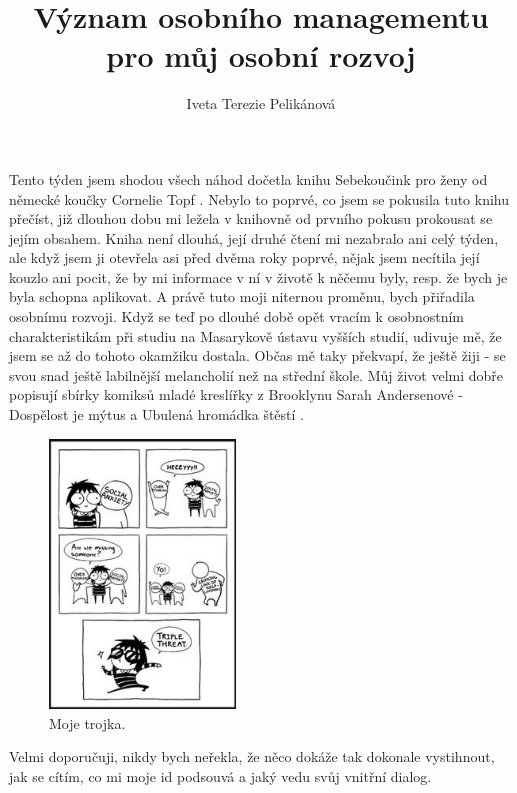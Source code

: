 \documentclass[a4paper]{scrartcl}
\title{Význam osobního managementu pro můj osobní rozvoj}
\subtitle{}
\author{Iveta Terezie Pelikánová}
\date{}
\begin{document}
\maketitle 

\noindent
Tento týden jsem shodou všech náhod dočetla knihu Sebekoučink pro ženy od německé koučky Cornelie Topf \cite{topf2014}. Nebylo to poprvé, co jsem se pokusila 
tuto knihu přečíst, již dlouhou dobu mi ležela v knihovně od prvního pokusu prokousat se jejím obsahem. Kniha není dlouhá, její druhé čtení mi nezabralo ani celý 
týden, ale když jsem ji otevřela asi před dvěma roky poprvé, nějak jsem necítila její kouzlo ani pocit, že by mi informace v ní v životě k něčemu byly, resp. že 
bych je byla schopna aplikovat. A právě tuto moji niternou proměnu, bych přiřadila osobnímu rozvoji. Když se teď po dlouhé době opět vracím k osobnostním 
charakteristikám při studiu na Masarykově ústavu vyšších studií, udivuje mě, že jsem se až do tohoto okamžiku dostala. Občas mě taky překvapí, že ještě žiji - se 
svou snad ještě labilnější melancholií než na střední škole\cite{odmaturuj2004}. Můj život velmi dobře popisují sbírky komiksů mladé kreslířky z Brooklynu Sarah 
Andersenové - Dospělost je mýtus a Ubulená hromádka štěstí \cite{dospelost_je_mytus,hromada_stesti}.
    
    \begin{figure}[h]
        \centering
        \includegraphics[width=0.44\textwidth]{triple_threat.jpg}
        \caption{Moje trojka.\cite{hromada_stesti}}
    \end{figure}

Velmi doporučuji, nikdy bych neřekla, že něco dokáže tak dokonale vystihnout, jak se cítím, co mi moje id podsouvá a jaký vedu svůj vnitřní dialog.\\
\end{document}
